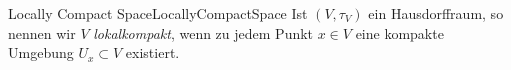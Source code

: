 \begin{mdef}{Locally Compact Space}{LocallyCompactSpace}
    Ist $(V,\tau_V)$ ein Hausdorffraum, so nennen wir $V$ \emph{lokalkompakt}, wenn zu jedem Punkt $x\in V$ eine kompakte Umgebung $U_x\subset V$ existiert.
\end{mdef}